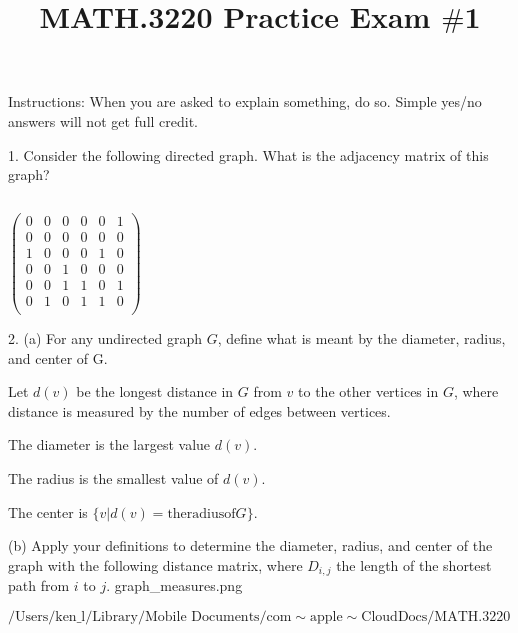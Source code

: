 \documentclass{article}
\begin{document}
\title{MATH.3220 Practice Exam $\#$1}
\author{}
\date{}
\maketitle



Instructions: { }When you are asked to explain something, do so. Simple yes/no answers will not get full credit.



1. Consider the following directed graph. What is the adjacency matrix of this graph? 

\begin{doublespace}
\noindent\(\)
\end{doublespace}

\begin{doublespace}
\noindent\(\left(
\begin{array}{cccccc}
 0 & 0 & 0 & 0 & 0 & 1 \\
 0 & 0 & 0 & 0 & 0 & 0 \\
 1 & 0 & 0 & 0 & 1 & 0 \\
 0 & 0 & 1 & 0 & 0 & 0 \\
 0 & 0 & 1 & 1 & 0 & 1 \\
 0 & 1 & 0 & 1 & 1 & 0 \\
\end{array}
\right)\)
\end{doublespace}



2. { } (a) For any undirected graph \(G\), define what is meant by the diameter, radius, and center of G.



Let \(d(v)\) be the longest distance in \(G\) from \(v\) to the other vertices in \(G\), { }where distance is measured by the number of edges between
vertices. 



The diameter is the largest value \(d(v)\).



The radius is the smallest value of \(d(v)\).



The center is \(\{v | d(v)=\text{the} \text{radius} \text{of} G\}\).



 { } { }(b) { } Apply your definitions to determine the diameter, radius, and center of the graph with the following distance matrix, where \(D_{i,j}\)
the length of the shortest path from \(i\) to \(j\).
graph_measures.png
\begin{doublespace}
\noindent\(\text{/Users/ken$\_$l/Library/Mobile Documents/com$\sim $apple$\sim $CloudDocs/MATH.3220}\)
\end{doublespace}
\end{document}
